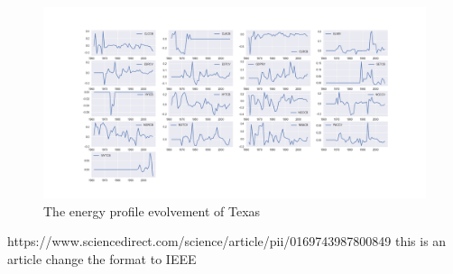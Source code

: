 \documentclass[]{article}
\begin{document}
\begin{figure}[htb]
\caption{The  energy profile evolvement of Texas}
\label{fig:Texas energy profile}
\includegraphics[scale=0.3]{tx.png}
\end{figure}


\begin{thebibliography}{1}	
	\bibitem{}  https://www.sciencedirect.com/science/article/pii/0169743987800849  this is an article change the format to IEEE	
\end{thebibliography}
\end{document}
